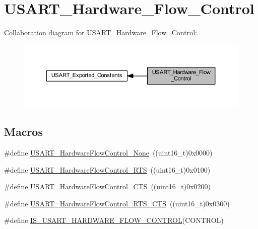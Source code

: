 \hypertarget{group___u_s_a_r_t___hardware___flow___control}{}\section{U\+S\+A\+R\+T\+\_\+\+Hardware\+\_\+\+Flow\+\_\+\+Control}
\label{group___u_s_a_r_t___hardware___flow___control}
Collaboration diagram for U\+S\+A\+R\+T\+\_\+\+Hardware\+\_\+\+Flow\+\_\+\+Control\+:
\nopagebreak
\begin{figure}[H]
\begin{center}
\leavevmode
\includegraphics[width=350pt]{group___u_s_a_r_t___hardware___flow___control}
\end{center}
\end{figure}
\subsection*{Macros}
\begin{DoxyCompactItemize}
\item 
\#define \hyperlink{group___u_s_a_r_t___hardware___flow___control_gaf3deaf4429b88db7753ee203f4797bd3}{U\+S\+A\+R\+T\+\_\+\+Hardware\+Flow\+Control\+\_\+\+None}~((uint16\+\_\+t)0x0000)
\item 
\#define \hyperlink{group___u_s_a_r_t___hardware___flow___control_ga22d4339693e3356d992abca259b0418e}{U\+S\+A\+R\+T\+\_\+\+Hardware\+Flow\+Control\+\_\+\+R\+TS}~((uint16\+\_\+t)0x0100)
\item 
\#define \hyperlink{group___u_s_a_r_t___hardware___flow___control_ga4d989f112f94009c0849fe4dbe829d81}{U\+S\+A\+R\+T\+\_\+\+Hardware\+Flow\+Control\+\_\+\+C\+TS}~((uint16\+\_\+t)0x0200)
\item 
\#define \hyperlink{group___u_s_a_r_t___hardware___flow___control_ga2986aed8c6cba414ac8afe0180ab553e}{U\+S\+A\+R\+T\+\_\+\+Hardware\+Flow\+Control\+\_\+\+R\+T\+S\+\_\+\+C\+TS}~((uint16\+\_\+t)0x0300)
\item 
\#define \hyperlink{group___u_s_a_r_t___hardware___flow___control_ga9b905eb465780173a2e98bc8b602c030}{I\+S\+\_\+\+U\+S\+A\+R\+T\+\_\+\+H\+A\+R\+D\+W\+A\+R\+E\+\_\+\+F\+L\+O\+W\+\_\+\+C\+O\+N\+T\+R\+OL}(C\+O\+N\+T\+R\+OL)
\end{DoxyCompactItemize}


